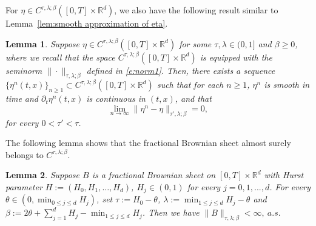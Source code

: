 \documentclass[11pt,reqno]{amsart}
\newtheorem{lemma}{Lemma}[section]
\numberwithin{equation}{section}
\begin{document}
For $\eta\in C^{\tau,\lambda;\beta}([0,T]\times\mathbb{R}^{d})$, we also have the following result similar to Lemma~\ref{lem:smooth approximation of eta}.

\begin{lemma}\label{lem:smooth approximation of eta'}
Suppose $\eta \in C^{\tau,\lambda;\beta}([0,T]\times\mathbb{R}^{d})$ for some $\tau,\lambda\in(0,1]$ and $\beta\ge 0$, where we recall that the space $C^{\tau,\lambda;\beta}([0,T]\times\mathbb{R}^d)$ is equipped with the seminorm $\|\cdot\|_{\tau, \lambda;\beta}$ defined in \eqref{e:norm1}. Then, there exists a sequence  $\{\eta^{n}(t,x)\}_{n\ge 1}\subset C^{\tau,\lambda;\beta}([0,T]\times\mathbb{R}^{d})$ such that for each $n\ge 1$, $\eta^{n}$ is smooth in time and $\partial_{t}\eta^{n}(t,x)$ is continuous in $(t,x)$,  and that 
\begin{equation*}
\lim_{n\to\infty}\|\eta^{n} - \eta\|_{\tau',\lambda;\beta}= 0, 
\end{equation*} 
for every $0<\tau'<\tau$.
\end{lemma}



The following lemma shows that the fractional Brownian sheet almost surely belongs to $C^{\tau,\lambda;\beta}$.


\begin{lemma}\label{lem:Hurst parameter}
Suppose $B$ is a fractional Brownian sheet on $[0,T]\times\mathbb{R}^{d}$ with Hurst parameter $H :=(H_{0},H_{1},\ldots,H_{d})$, $H_{j}\in(0,1)$ for every $j=0,1,...,d$. For every  $\theta\in(0,\min_{0\le j\le d}H_j)$, set $\tau := H_{0}-\theta$, $\lambda := \min_{1\le j\le d}H_{j} - \theta$ and $\beta := 2\theta + \sum_{j=1}^{d}H_{j} - \min_{1\le j\le d}H_{j}$. Then we have
$
\|B\|_{\tau,\lambda;\beta}<\infty,\  a.s.
$
\end{lemma}
\end{document}
